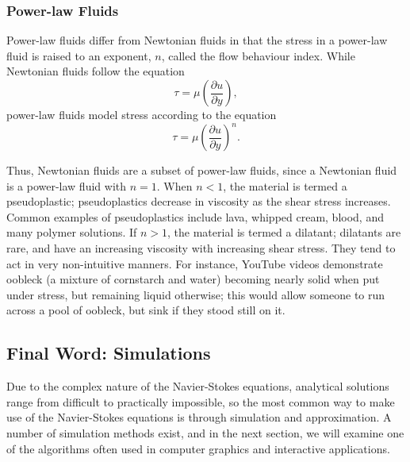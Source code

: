 \documentclass[a4paper]{article}
\begin{document}
\subsubsection*{Power-law Fluids}
Power-law fluids differ from Newtonian fluids in that the stress in a power-law fluid is raised to an exponent, $n$, called the flow behaviour index. While Newtonian fluids follow the equation
\[\tau = \mu \left( \frac{\partial u}{\partial y} \right),\]
power-law fluids model stress according to the equation
\[\tau = \mu \left( \frac{\partial u}{\partial y} \right)^n.\]


Thus, Newtonian fluids are a subset of power-law fluids, since a Newtonian fluid is a power-law fluid with $n=1$. When $n<1$, the material is termed a pseudoplastic; pseudoplastics decrease in viscosity as the shear stress increases. Common examples of pseudoplastics include lava, whipped cream, blood, and many polymer solutions. If $n>1$, the material is termed a dilatant; dilatants are rare, and have an increasing viscosity with increasing shear stress. They tend to act in very non-intuitive manners. For instance, YouTube videos demonstrate oobleck (a mixture of cornstarch and water) becoming nearly solid when put under stress, but remaining liquid otherwise; this would allow someone to run across a pool of oobleck, but sink if they stood still on it.


\subsection*{Final Word: Simulations}
Due to the complex nature of the Navier-Stokes equations, analytical solutions range from difficult
to practically impossible, so the most common way to make use of the Navier-Stokes equations is
through simulation and approximation. A number of simulation methods exist, and in the next section,
we will examine one of the algorithms often used in computer graphics and interactive applications. 
\end{document}
